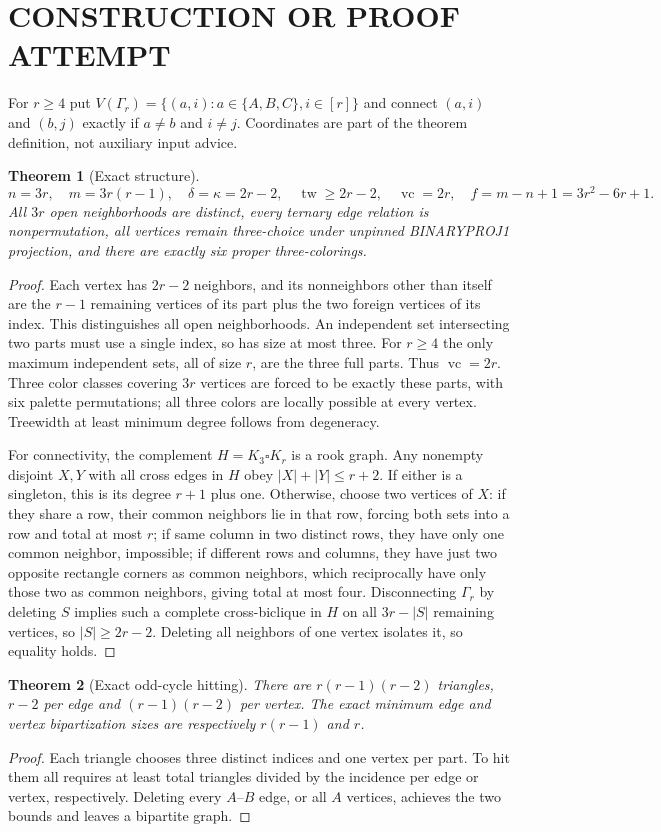\documentclass{article}
\newtheorem{theorem}{Theorem}
\begin{document}
\section{CONSTRUCTION OR PROOF ATTEMPT}
For $r\ge4$ put $V(\Gamma_r)=\{(a,i):a\in\{A,B,C\},i\in[r]\}$ and connect $(a,i)$ and $(b,j)$ exactly if $a\ne b$ and $i\ne j$. Coordinates are part of the theorem definition, not auxiliary input advice.
\begin{theorem}[Exact structure]
\[
n=3r,\quad m=3r(r-1),\quad\delta=\kappa=2r-2,\quad
\operatorname{tw}\ge2r-2,\quad
\operatorname{vc}=2r,\quad f=m-n+1=3r^2-6r+1.
\]
All $3r$ open neighborhoods are distinct, every ternary edge relation is nonpermutation, all vertices remain three-choice under unpinned BINARYPROJ1 projection, and there are exactly six proper three-colorings.
\end{theorem}
\begin{proof}
Each vertex has $2r-2$ neighbors, and its nonneighbors other than itself are the $r-1$ remaining vertices of its part plus the two foreign vertices of its index. This distinguishes all open neighborhoods. An independent set intersecting two parts must use a single index, so has size at most three. For $r\ge4$ the only maximum independent sets, all of size $r$, are the three full parts. Thus $\operatorname{vc}=2r$. Three color classes covering $3r$ vertices are forced to be exactly these parts, with six palette permutations; all three colors are locally possible at every vertex. Treewidth at least minimum degree follows from degeneracy.

For connectivity, the complement $H=K_3\square K_r$ is a rook graph. Any nonempty disjoint $X,Y$ with all cross edges in $H$ obey $|X|+|Y|\le r+2$. If either is a singleton, this is its degree $r+1$ plus one. Otherwise, choose two vertices of $X$: if they share a row, their common neighbors lie in that row, forcing both sets into a row and total at most $r$; if same column in two distinct rows, they have only one common neighbor, impossible; if different rows and columns, they have just two opposite rectangle corners as common neighbors, which reciprocally have only those two as common neighbors, giving total at most four. Disconnecting $\Gamma_r$ by deleting $S$ implies such a complete cross-biclique in $H$ on all $3r-|S|$ remaining vertices, so $|S|\ge2r-2$. Deleting all neighbors of one vertex isolates it, so equality holds.
\end{proof}

\begin{theorem}[Exact odd-cycle hitting]
There are $r(r-1)(r-2)$ triangles, $r-2$ per edge and $(r-1)(r-2)$ per vertex. The exact minimum edge and vertex bipartization sizes are respectively $r(r-1)$ and $r$.
\end{theorem}
\begin{proof}
Each triangle chooses three distinct indices and one vertex per part. To hit them all requires at least total triangles divided by the incidence per edge or vertex, respectively. Deleting every $A$--$B$ edge, or all $A$ vertices, achieves the two bounds and leaves a bipartite graph.
\end{proof}
\end{document}
